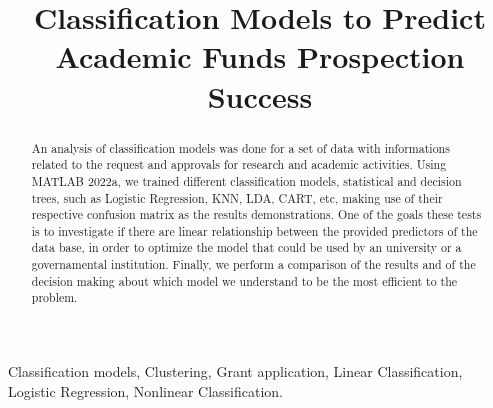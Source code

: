 \documentclass[conference]{IEEEtran}
\begin{document}
\title{Classification Models to Predict Academic Funds Prospection Success}

\author{
\and
{}
}

\maketitle

\begin{abstract}
An analysis of classification models was done for a set of data with informations related to the request and approvals for research and academic activities. Using MATLAB 2022a, we trained different classification models, statistical and decision trees, such as Logistic Regression, KNN, LDA, CART, etc, making use of their respective confusion matrix as the results demonstrations. One of the goals these tests is to investigate if there are linear relationship between the provided predictors of the data base, in order to optimize the model that could be used by an university or a governamental institution. Finally, we perform a comparison of the results and of the decision making about which model we understand to be the most efficient to the problem.  
\end{abstract}

\begin{IEEEkeywords}
Classification models, Clustering, Grant application, Linear Classification, Logistic Regression, Nonlinear Classification.
\end{IEEEkeywords}












\end{document}
